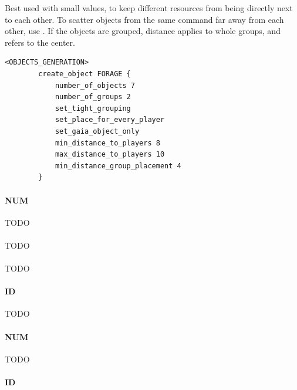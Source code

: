 \begin{appendices}
    Best used with small values, to keep different resources from being directly next to each other. To scatter objects from the same command far away from each other, use . If the objects are grouped, distance applies to whole groups, and refers to the center.

    \begin{lstlisting}[language={rms}, caption={Give each player two sets of forages and make them avoid each other by 4 tiles, and keep all future objects 4 tiles away.}]
        <OBJECTS_GENERATION>
        create_object FORAGE {
            number_of_objects 7
            number_of_groups 2
            set_tight_grouping
            set_place_for_every_player
            set_gaia_object_only
            min_distance_to_players 8
            max_distance_to_players 10
            min_distance_group_placement 4
        }
    \end{lstlisting}

    \paragraph{ NUM}

    TODO

    \paragraph{}

    TODO

    \paragraph{}

    TODO

    \paragraph{ ID}

    TODO

    \paragraph{ NUM}

    TODO

    \paragraph{ ID}


\end{appendices}
